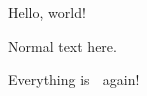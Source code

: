 \documentclass{vomit}
\begin{document}
Hello, world!

\stopvomit
Normal text here.

\startvomit
Everything is 🤮 again!
\end{document}
